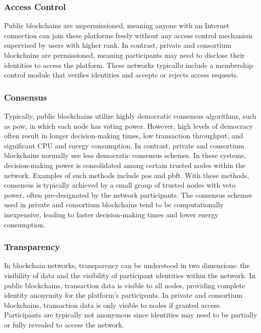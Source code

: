 \documentclass[conference]{IEEEtran}
\begin{document}
\subsubsection{Access Control}Public blockchains are unpermissioned, meaning anyone with an Internet connection can join these platforms freely without any access control mechanism supervised by users with higher rank. In contrast, private and consortium blockchains are permissioned, meaning participants may need to disclose their identities to access the platform. These networks typicallu include a membership control module that verifies identities and accepts or rejects access requests. \\

\subsubsection{Consensus} Typically, public blockchains utilize highly democratic consensus algorithms, such as \ac{pow}, in which each node has voting power. However, high levels of democracy often result in longer decision-making times, low transaction throughput, and significant CPU and energy consumption. In contrast, private and consortium blockchains normally use less democratic consensus schemes. In these systems, decision-making power is consolidated among certain trusted nodes within the network. Examples of such methods include \ac{pos} and \ac{pbft}. With these methods, consensus is typically achieved by a small group of trusted nodes with veto power, often pre-designated by the network participants. The consensus schemes used in private and consortium blockchains tend to be computationally inexpensive, leading to faster decision-making times and lower energy consumption.\\

\subsubsection{Transparency} In blockchain networks, transparency can be understood in two dimensions: the visibility of data and the visibility of participant identities within the network. In public blockchains, transaction data is visible to all nodes, providing complete identity anonymity for the platform's participants. In private and consortium blockchains, transaction data is only visible to nodes if granted access. Participants are typically not anonymous since identities may need to be partially or fully revealed to access the network. \\
\end{document}
